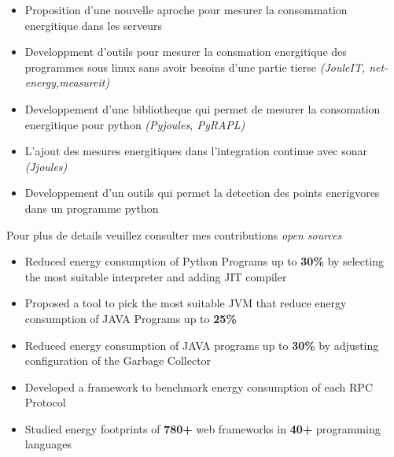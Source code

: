 \documentclass[10pt,a4paper,ragged2e,withhyper]{altacv}
\begin{document}
\begin{paracol}{2}
  \medskip

  \begin{itemize}
    \item Proposition d'une nouvelle aproche pour mesurer la consommation energitique dans les serveurs
    \item Developpment d'outils pour mesurer la consmation energitique des programmes sous linux sans avoir besoins d'une partie tierse \emph{(JouleIT, net-energy,measureit)}
    \item Developpement d'une bibliotheque qui permet de mesurer la consomation energitique pour python \emph{(Pyjoules, PyRAPL)}
    \item L'ajout des mesures energitiques dans l'integration continue avec sonar \emph{(Jjoules)}
    \item Developpement d'un outils qui permet la detection des points enerigvores dans un programme python
  \end{itemize}
  Pour plus de details veuillez consulter mes contributions \emph{open sources}
  \\
  \begin{itemize}
    \item Reduced energy consumption of Python Programs up to \textbf{30\%} by selecting the most suitable interpreter and adding JIT compiler
    \item Proposed a tool to pick the most suitable JVM that reduce energy consumption of JAVA Programs up to \textbf{25\%}
    \item Reduced energy consumption of JAVA programs up to \textbf{30\%} by adjusting configuration of the Garbage Collector
  \end{itemize}

  \begin{itemize}
    \item Developed a framework to benchmark energy consumption of each RPC Protocol
    \item Studied energy footprints of \textbf{780+} web frameworks in \textbf{40+} programming languages
  \end{itemize}


\end{paracol}
\end{document}
